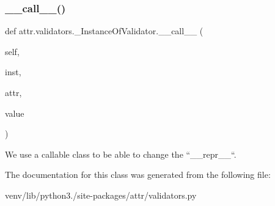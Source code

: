 \subsubsection{\texorpdfstring{\+\_\+\+\_\+call\+\_\+\+\_\+()}{\_\_call\_\_()}}
{\footnotesize\ttfamily def attr.\+validators.\+\_\+\+Instance\+Of\+Validator.\+\_\+\+\_\+call\+\_\+\+\_\+ (\begin{DoxyParamCaption}\item[{}]{self,  }\item[{}]{inst,  }\item[{}]{attr,  }\item[{}]{value }\end{DoxyParamCaption})}

\begin{DoxyVerb}We use a callable class to be able to change the ``__repr__``.
\end{DoxyVerb}
 

The documentation for this class was generated from the following file\+:\begin{DoxyCompactItemize}
\item 
venv/lib/python3./site-\/packages/attr/validators.\+py\end{DoxyCompactItemize}
